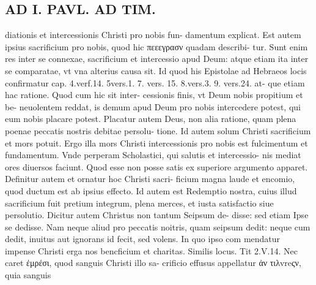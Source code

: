 \documentclass{article}
\begin{document}
\begin{pages}
\section*{AD I. PAVL. AD TIM. }
\marginpar{[ p.oo ]}\pstart diationis et intercessionis Christi pro nobis fun- damentum explicat. Est autem ipsius sacrificium pro nobis, quod hic πεεεγρασν quadam describi- tur. Sunt enim res inter se connexae, sacrificium et intercessio apud Deum: atque etiam ita inter se comparatae, vt vna alterius causa sit. Id quod his Epistolae ad Hebraeos locis confirmatur cap. 4.verf.14. 5vers.1. 7. vers. 15. 8.vers.3. 9. vers.24. at- que etiam hac ratione. Quod cum hic sit inter- cessionis finis, vt Deum nobis propitium et be- neuolentem reddat, is demum apud Deum pro nobis intercedere potest, qui eum nobis placare potest. Placatur autem Deus, non alia ratione, quam plena poenae peccatis nostris debitae persolu- tione. Id autem solum Christi sacrificium et mors potuit. Ergo illa mors Christi intercessionis pro nobis est fulcimentum et fundamentum. Vnde perperam Scholastici, qui salutis et intercessio- nis mediat ores diuersos faciunt. Quod esse non posse satis ex superiore argumento apparet. Definitur autem et ornatur hoc Christi sacri- ficium magna laude et encomio, quod ductum est ab ipsius effecto. Id autem est Redemptio nostra, cuius illud sacrificium fuit pretium integrum, plena merces, et iusta satisfactio siue persolutio. Dicitur autem Christus non tantum Seipsum de- disse: sed etiam Ipse se dedisse. Nam neque aliud pro peccatis noitris, quam seipsum dedit: neque cum dedit, inuitus aut ignorans id fecit, sed volens. In quo ipso com mendatur impense Christi erga nos bencficium et charitas. Similis locus. Tit 2.V.14. Nec caret ἐμρέσι, quod sanguis Christi illo sa- crificio effusus appellatur ἀν τιλvreςν, quia sanguis  \pend

\end{pages}
\end{document}
